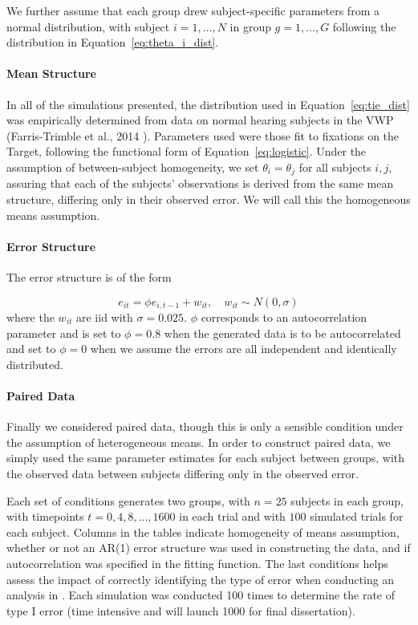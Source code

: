 We further assume that each group drew subject-specific parameters from a normal distribution, with subject $i = 1, \dots, N$ in group $g = 1, \dots, G$ following the distribution in Equation~\ref{eq:theta_i_dist}.


\paragraph{Mean Structure} In all of the simulations presented, the distribution used in Equation~\ref{eq:tie_dist} was empirically determined from data on normal hearing subjects in the VWP (Farris-Trimble et  al., 2014 \cite{FarrisTrimble2014}). Parameters used were those fit to fixations on the Target, following the functional form of Equation~\ref{eq:logistic}. Under the assumption of between-subject homogeneity, we set $\theta_i = \theta_j$ for all subjects $i,j$, assuring that each of the subjects' observations is derived from the same mean structure, differing only in their observed error. We will call this the homogeneous means assumption.


\paragraph{Error Structure} The error structure is of the form

\begin{equation}
e_{it} = \phi e_{i, t-1} + w_{it}, \quad w_{it} \sim N(0, \sigma)
\end{equation}
where the $w_{it}$ are iid with $\sigma = 0.025$. $\phi$ corresponds to an autocorrelation parameter and is set to $\phi = 0.8$ when the generated data is to be autocorrelated and set to $\phi = 0$ when we assume the errors are all independent and identically distributed. 

\paragraph{Paired Data} Finally we considered paired data, though this is only a sensible condition under the assumption of heterogeneous means. In order to construct paired data, we simply used the same parameter estimates for each subject between groups, with the observed data between subjects differing only in the observed error.


Each set of conditions generates two groups, with $n = 25$ subjects in each group, with timepoints $t = 0, 4, 8, \dots, 1600$ in each trial and with $100$ simulated trials for each subject. Columns in the tables indicate homogeneity of means assumption, whether or not an AR(1) error structure was used in constructing the data, and if autocorrelation was specified in the fitting function. The last conditions helps assess the impact of correctly identifying the type of error when conducting an analysis in . Each simulation was conducted 100 times to determine the rate of type I error (time intensive and will launch 1000 for final dissertation). 


